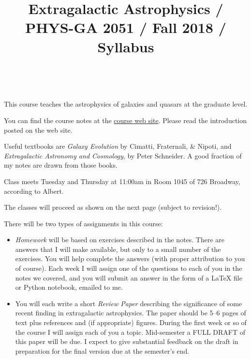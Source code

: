 \documentclass[11pt, preprint]{aastex}
\begin{document}
\title{\bf Extragalactic Astrophysics / PHYS-GA 2051 / Fall 2018 / Syllabus }

~

\noindent This course teaches the astrophysics of galaxies and quasars
at the graduate level.

\noindent You can find the course notes at the
\href{http://blanton144.github.io/exex}{course web site}. Please read
the introduction posted on the web site.

\noindent Useful textbooks are {\it Galaxy Evolution} by Cimatti,
Fraternali, \& Nipoti, and {\it Extragalactic Astronomy and
  Cosmology}, by Peter Schneider. A good fraction of my notes are
drawn from those books.

\noindent Class meets Tuesday and Thursday at 11:00am in Room 1045 of
726 Broadway, according to Albert.

\noindent The classes will proceed as shown on the next page (subject
to revision!).

\noindent There will be two types of assignments in this course:

\begin{itemize}

\item {\it Homework} will be based on exercises described in the
  notes. There are answers that I will make available, but only to
  a small number of the exercises. You will help complete the answers
  (with proper attribution to you of course). Each week I will assign
  one of the questions to each of you in the notes we covered, and you
  will submit an answer in the form of a LaTeX file or Python
  notebook, emailed to me.

\item You will each write a short {\it Review Paper} describing the
  significance of some recent finding in extragalactic
  astrophysics. The paper should be 5--6 pages of text plus references
  and (if appropriate) figures. During the first week or so of the
  course I will assign each of you a topic. Mid-semester a FULL DRAFT
  of this paper will be due. I expect to give substantial feedback on
  the draft in preparation for the final version due at the semester's
  end.

\end{itemize}
\end{document}
